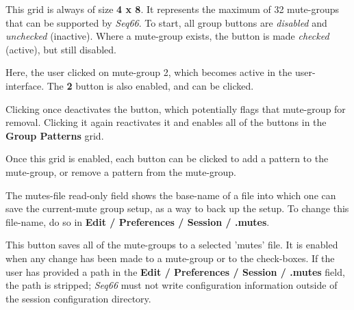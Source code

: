    This grid is always of size \textbf{4 x 8}.
   It represents the maximum of 32
   mute-groups that can be supported by \textsl{Seq66}.
   To start, all group buttons are \textsl{disabled} and
   \textsl{unchecked} (inactive).
   Where a mute-group exists, the button is made \textsl{checked} (active),
   but still disabled.

   Here, the user clicked on mute-group 2, which becomes active in the
   user-interface.
   The \textbf{2} button is also enabled, and can be clicked.

   Clicking once deactivates the button, which potentially flags that
   mute-group for removal.
   Clicking it again reactivates it and
   enables all of the
   buttons in the \textbf{Group Patterns} grid.

   Once this grid is enabled, each button can be clicked to add a pattern to
   the mute-group, or remove a pattern from the mute-group.


   The mutes-file read-only field
   shows the base-name of a file into which one can save the
   current-mute group setup, as a way to back up the setup.
   To change this file-name, do so in
   \textbf{Edit / Preferences / Session / .mutes}.

   This button saves all of the mute-groups to a selected 'mutes' file.
   It is enabled when any change has been made to a mute-group
   or to the check-boxes.
   If the user has provided a path in the
   \textbf{Edit / Preferences / Session / .mutes} field,
   the path is stripped;
   \textsl{Seq66} must not write configuration information outside of
   the session configuration directory.


